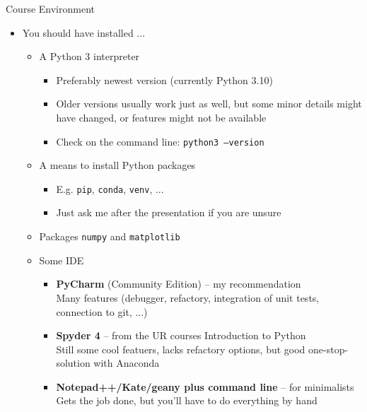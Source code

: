 \begin{frame}{Course Environment}
%
\begin{itemize}
\item You should have installed ...
	\begin{itemize}
	\item A Python 3 interpreter
		\begin{itemize}
		\item Preferably newest version (currently Python 3.10)
		\item Older versions usually work just as well, but some minor details might have changed, or features might not be available
		\item Check on the command line: \texttt{python3 --version}
		\end{itemize}
	\item A means to install Python packages
		\begin{itemize}
		\item E.\;g. \texttt{pip}, \texttt{conda}, \texttt{venv}, ...
		\item Just ask me after the presentation if you are unsure
		\end{itemize}
	\item Packages \texttt{numpy} and \texttt{matplotlib}
	\item Some IDE
		\begin{itemize}
		\item \textbf{PyCharm} (Community Edition) -- my recommendation\\
			Many features (debugger, refactory, integration of unit tests, connection to git, ...)
		\item \textbf{Spyder 4} -- from the UR courses Introduction to Python\\
			Still some cool featuers, lacks refactory options, but good one-stop-solution with Anaconda
		\item \textbf{Notepad++/Kate/geany plus command line} -- for minimalists\\
			Gets the job done, but you'll have to do everything by hand
		\end{itemize}
	\end{itemize}
\end{itemize}
%
\end{frame}


